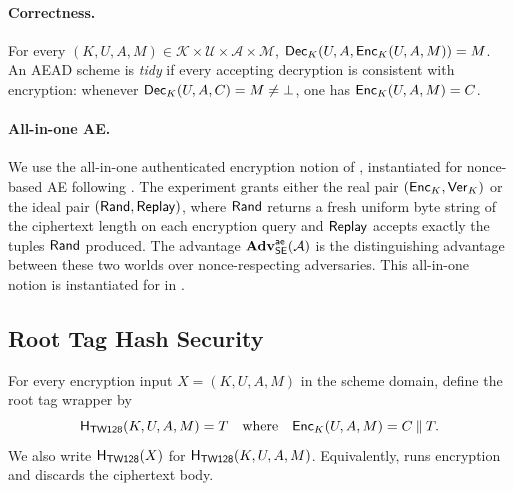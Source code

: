 \paragraph{Correctness.}
For every $(K, U, A, M) \in \mathcal{K} \times \mathcal{U} \times
\mathcal{A} \times \mathcal{M}$, $\mathsf{Dec}_K(U, A, \mathsf{Enc}_K(U, A, M)) = M$.
An AEAD scheme is \emph{tidy} if every accepting decryption is consistent
with encryption: whenever $\mathsf{Dec}_K(U, A, C) = M \neq \bot$, one has
$\mathsf{Enc}_K(U, A, M) = C$.

\paragraph{All-in-one AE.}
We use the all-in-one authenticated encryption notion of \cite{RS06},
instantiated for nonce-based AE following \cite{BT16}. The experiment
grants either the real pair $(\mathsf{Enc}_K,\mathsf{Ver}_K)$ or the ideal pair
$(\mathsf{Rand},\mathsf{Replay})$, where $\mathsf{Rand}$ returns a fresh uniform byte string of
the ciphertext length on each encryption query and $\mathsf{Replay}$ accepts
exactly the tuples $\mathsf{Rand}$ produced. The advantage
$\mathbf{Adv}^{\mathsf{ae}}_{\mathsf{SE}}(\mathcal{A})$ is the distinguishing advantage between these
two worlds over nonce-respecting adversaries. This all-in-one notion is
instantiated for \TW{} in .

\subsection{Root Tag Hash Security}
\label{sec:root-tag-defs}

\begin{definition}
\label{def:htw}
For every \TW{} encryption input $X = (K,U,A,M)$ in the scheme domain,
define the root tag wrapper by
\[
  \mathsf{H}_{\mathsf{TW128}}(K,U,A,M) = T
  \quad\text{where}\quad
  \mathsf{Enc}_K(U,A,M) = C \mathbin{\|} T.
\]
We also write $\mathsf{H}_{\mathsf{TW128}}(X)$ for $\mathsf{H}_{\mathsf{TW128}}(K,U,A,M)$. Equivalently, \HTW{} runs
\TW{} encryption and discards the ciphertext body.
\end{definition}

